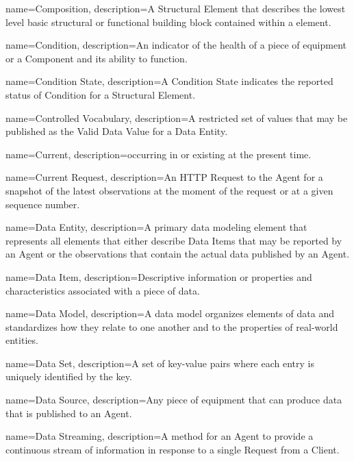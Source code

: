 {
    name={Composition},
	description={A \gls{Structural Element} that describes the lowest level basic structural or functional building block contained within a  element.}
}

{
    name={Condition},
	description={An indicator of the health of a piece of equipment or a \gls{Component} and its ability to function.}
}

{
    name={Condition State},
	description={A \gls{Condition State} indicates the reported status of \gls{Condition} for a \gls{Structural Element}.}
}

{
    name={Controlled Vocabulary},
	description={A restricted set of values that may be published as the \gls{Valid Data Value} for a \gls{Data Entity}.}
}

{
    name={Current},
	description={occurring in or existing at the present time.}
}

{
    name={Current Request},
	description={An \gls{HTTP Request} to the \gls{Agent} for a snapshot of the latest \glspl{observation} at the moment of the request or at a given sequence number.}
}

{
    name={Data Entity},
	description={A primary data modeling element that represents all elements that either describe \glspl{Data Item} that may be reported by an \gls{Agent} or the \glspl{observation} that contain the actual data published by an \gls{Agent}.
}
}

{
    name={Data Item},
	description={Descriptive information or properties and characteristics associated with a piece of data.
}
}

{
    name={Data Model},
	description={A data model organizes elements of data and standardizes how they relate to one another and to the properties of real-world entities.}
}

{
    name={Data Set},
	description={A set of \glspl{key-value pair} where each entry is uniquely identified by the \gls{key}.}
}

{
    name={Data Source},
	description={Any piece of equipment that can produce data that is published to an \gls{Agent}.
}
}

{
    name={Data Streaming},
	description={A method for an \gls{Agent} to provide a continuous stream of information in response to a single \gls{Request} from a \gls{Client}.}
}

